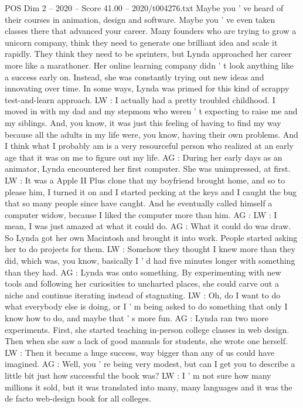 \begin{textsample}{POS Dim 2 – 2020 – Score 41.00 – 2020/t004276.txt}
Maybe you ' ve heard of their courses in animation, design and software.
Maybe you ' ve even taken classes there that advanced your career.
Many founders who are trying to grow a unicorn company, think they need to generate one brilliant idea and scale it rapidly.
They think they need to be sprinters, but Lynda approached her career more like a marathoner.
Her online learning company didn ' t look anything like a success early on.
Instead, she was constantly trying out new ideas and innovating over time.
In some ways, Lynda was primed for this kind of scrappy test-and-learn approach.
LW : I actually had a pretty troubled childhood.
I moved in with my dad and my stepmom who weren ' t expecting to raise me and my siblings.
And, you know, it was just this feeling of having to find my way because all the adults in my life were, you know, having their own problems.
And I think what I probably am is a very resourceful person who realized at an early age that it was on me to figure out my life.
AG : During her early days as an animator, Lynda encountered her first computer.
She was unimpressed, at first.
LW : It was a Apple II Plus clone that my boyfriend brought home, and so to please him, I turned it on and I started pecking at the keys and I caught the bug that so many people since have caught.
And he eventually called himself a computer widow, because I liked the computer more than him.
AG : LW : I mean, I was just amazed at what it could do.
AG : What it could do was draw.
So Lynda got her own Macintosh and brought it into work.
People started asking her to do projects for them.
LW : Somehow they thought I knew more than they did, which was, you know, basically I ' d had five minutes longer with something than they had.
AG : Lynda was onto something.
By experimenting with new tools and following her curiosities to uncharted places, she could carve out a niche and continue iterating instead of stagnating.
LW : Oh, do I want to do what everybody else is doing, or I ' m being asked to do something that only I know how to do, and maybe that ' s more fun.
AG : Lynda ran two more experiments.
First, she started teaching in-person college classes in web design.
Then when she saw a lack of good manuals for students, she wrote one herself.
LW : Then it became a huge success, way bigger than any of us could have imagined.
AG : Well, you ' re being very modest, but can I get you to describe a little bit just how successful the book was?
LW : I ' m not sure how many millions it sold, but it was translated into many, many languages and it was the de facto web-design book for all colleges.

\end{textsample}
